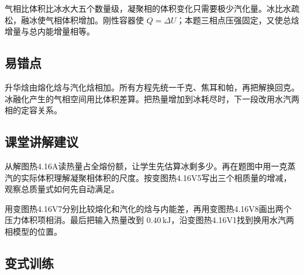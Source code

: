 \documentclass[UTF8,fontset=fandol,a4paper,11pt]{ctexart}
\begin{document}
气相比体积比冰水大五个数量级，凝聚相的体积变化只需要极少汽化量。冰比水疏松，融冰使气相体积增加。刚性容器使 $Q=\Delta U$；本题三相点压强固定，又使总焓增量与总内能增量相等。



\subsection*{易错点}

升华焓由熔化焓与汽化焓相加。所有方程先统一千克、焦耳和帕，再把解换回克。冰融化产生的气相空间用比体积差算。把热量增加到冰耗尽时，下一段改用水汽两相的定容关系。



\subsection*{课堂讲解建议}

从解图热4.16A读热量占全熔份额，让学生先估算冰剩多少。再在题图中用一克蒸汽的实际体积理解凝聚相体积的尺度。按变图热4.16V5写出三个相质量的增减，观察总质量式如何先自动满足。

用变图热4.16V7分别比较熔化和汽化的焓与内能差，再用变图热4.16V8画出两个压力体积项相消。最后把输入热量改到 $0.40\,\mathrm{kJ}$，沿变图热4.16V1找到换用水汽两相模型的位置。



\subsection*{变式训练}
\end{document}

